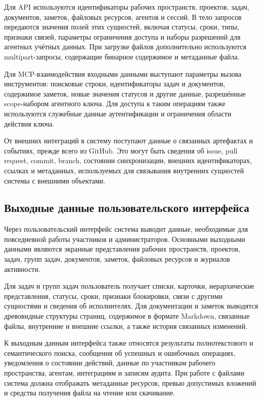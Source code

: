 Для API используются идентификаторы рабочих пространств, проектов, задач, документов, заметок, файловых ресурсов, агентов и сессий. В тело запросов передаются значения полей этих сущностей, включая статусы, сроки, типы, признаки связей, параметры ограничения доступа и наборы разрешений для агентных учётных данных. При загрузке файлов дополнительно используются multipart-запросы, содержащие бинарное содержимое и метаданные файла.

Для MCP-взаимодействия входными данными выступают параметры вызова инструментов: поисковые строки, идентификаторы задач и документов, содержимое заметок, новые значения статусов и другие данные, разрешённые scope-набором агентного ключа. Для доступа к таким операциям также используются служебные данные аутентификации и ограничения области действия ключа.

От внешних интеграций в систему поступают данные о связанных артефактах и событиях, прежде всего из GitHub. Это могут быть сведения об issue, pull request, commit, branch, состоянии синхронизации, внешних идентификаторах, ссылках и метаданных, используемых для связывания внутренних сущностей системы с внешними объектами.

\textheadingsep
\subsection{Выходные данные пользовательского интерфейса}

\headingtextsep

Через пользовательский интерфейс система выводит данные, необходимые для повседневной работы участников и администраторов. Основными выходными данными являются экранные представления рабочих пространств, проектов, задач, групп задач, документов, заметок, файловых ресурсов и журналов активности.

Для задач и групп задач пользователь получает списки, карточки, иерархические представления, статусы, сроки, признаки блокировки, связи с другими сущностями и сведения об исполнителях. Для документации и заметок выводятся древовидные структуры страниц, содержимое в формате Markdown, связанные файлы, внутренние и внешние ссылки, а также история связанных изменений.

К выходным данным интерфейса также относятся результаты полнотекстового и семантического поиска, сообщения об успешных и ошибочных операциях, уведомления о состоянии действий, данные по участникам рабочего пространства, агентам, интеграциям и записям аудита. При работе с файлами система должна отображать метаданные ресурсов, превью допустимых вложений и средства получения файла на чтение или скачивание.

